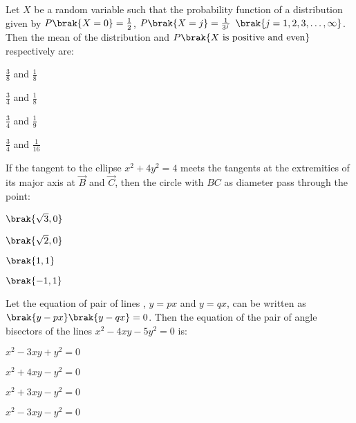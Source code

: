 \iffalse
\title{Assignment 3}
\author{EE24Btech11024 - G. Abhimanyu Koushik}
\section{mcq-single}
\fi

\item Let $X$ be a random variable such that the probability function of a distribution given by $P\brak{X=0}=\frac{1}{2}$, $P\brak{X=j}=\frac{1}{3^j}$ $\brak{j=1,2,3,\dots,\infty}$. Then the mean of the distribution and $P\brak{X\text{ is positive and even}}$ respectively are:

\hfill{}
\begin{enumerate}
\begin{multicols}{4}
\item $\frac{3}{8}$ and $\frac{1}{8}$
\item $\frac{3}{4}$ and $\frac{1}{8}$
\item $\frac{3}{4}$ and $\frac{1}{9}$
\item $\frac{3}{4}$ and $\frac{1}{16}$
\end{multicols}
\end{enumerate}

\item If the tangent to the ellipse $x^2+4y^2=4$ meets the tangents at the extremities of its major axis at $\vec{B}$ and $\vec{C}$, then the circle with $BC$ as diameter pass through the point:

\hfill{}
\begin{enumerate}
\begin{multicols}{4}
\item $\brak{\sqrt{3},0}$
\item $\brak{\sqrt{2},0}$
\item $\brak{1,1}$
\item $\brak{-1,1}$
\end{multicols}
\end{enumerate}

\item Let the equation of pair of lines , $y=px$ and $y=qx$, can be written as $\brak{y-px}\brak{y-qx}=0$. Then the equation of the pair of angle bisectors of the lines $x^2-4xy-5y^2=0$ is:

\hfill{}
\begin{enumerate}
\begin{multicols}{4}
\item $x^2-3xy+y^2=0$
\item $x^2+4xy-y^2=0$
\item $x^2+3xy-y^2=0$
\item $x^2-3xy-y^2=0$
\end{multicols}
\end{enumerate}

